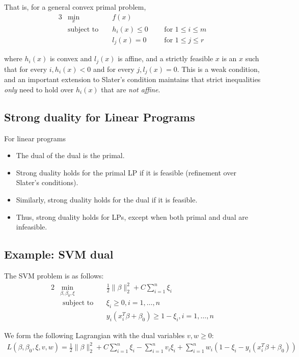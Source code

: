\documentclass[11pt]{article}
\begin{document}
That is, for a general convex primal problem,
\begin{alignat*}{3}
&\min_x &&f(x) \\
&\text{subject to } && h_i(x) \leq 0 ~~~&&\text{for } 1 \leq i \leq m \\
&&& l_j(x) = 0 ~~~&&\text{for } 1 \leq j \leq r
\end{alignat*}

where $h_i(x)$ is convex and $l_j(x)$ is affine, and a strictly feasible $x$ is
an $x$ such that for every $i, h_i(x) < 0$ and for every
$j, l_j(x) = 0$. This is a weak condition, and an important extension to Slater's condition maintains that strict inequalities \emph{only} need to hold over $h_i\left(x\right)$ that are \emph{not affine}.

\subsection{Strong duality for Linear Programs}
For linear programs
\begin{itemize}
\item The dual of the dual is the primal.
\item Strong duality holds for the primal LP if it is feasible (refinement over Slater's conditions).
\item Similarly, strong duality holds for the dual if it is feasible.
\item Thus, strong duality holds for LPs, except when both primal and dual are infeasible.
\end{itemize}

\subsection{Example: SVM dual}
The SVM problem is as follows:
\begin{alignat*}{2}
&\min_{\beta, \beta_{0}, \xi} && \frac{1}{2} \| \beta \|^{2}_{2} + C \sum_{i=1}^{n}\xi_{i} \\
&\text{ subject to}&~& \xi_{i} \geq 0, i = 1, \dots, n \\
&&& y_{i}\left( x_{i}^{T} \beta + \beta_{0} \right) \geq 1-\xi_{i}, i = 1, \dots, n
\end{alignat*}

We form the following Lagrangian with the dual variables $v,w \geq 0$:
\begin{align*}
L\left(\beta, \beta_{0}, \xi, v, w\right) = \frac{1}{2} \| \beta \|^{2}_{2} + C \sum_{i=1}^{n}\xi_{i} - \sum_{i=1}^{n}v_{i}\xi_{i} + \sum_{i=1}^{n} w_{i}\left(1 - \xi_{i} - y_{i}\left(x_{i}^{T}\beta + \beta_{0}\right) \right)
\end{align*}
\end{document}
